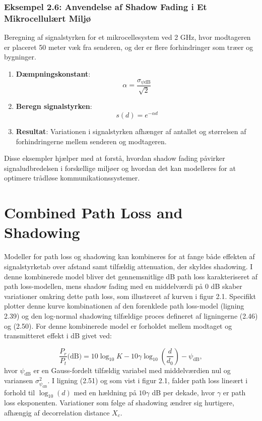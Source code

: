 \documentclass[a4paper,12pt]{book}
\begin{document}
	\subsubsection{Eksempel 2.6: Anvendelse af Shadow Fading i Et Mikrocellulært Miljø}
	
	Beregning af signalstyrken for et mikrocellesystem ved 2 GHz, hvor modtageren er placeret 50 meter væk fra senderen, og der er flere forhindringer som træer og bygninger.
	
	\begin{enumerate}
		\item \textbf{Dæmpningskonstant}:
		\[
		\alpha = \frac{\sigma_{\psi\text{dB}}}{\sqrt{2}}
		\]
		\item \textbf{Beregn signalstyrken}:
		\[
		s(d) = e^{-\alpha d}
		\]
		\item \textbf{Resultat}: Variationen i signalstyrken afhænger af antallet og størrelsen af forhindringerne mellem senderen og modtageren.
	\end{enumerate}
	
	Disse eksempler hjælper med at forstå, hvordan shadow fading påvirker signaludbredelsen i forskellige miljøer og hvordan det kan modelleres for at optimere trådløse kommunikationssystemer.
	
	\section{Combined Path Loss and Shadowing}
	Modeller for path loss og shadowing kan kombineres for at fange både effekten af signalstyrketab over afstand samt tilfældig attenuation, der skyldes shadowing. I denne kombinerede model bliver det gennemsnitlige dB path loss karakteriseret af path loss-modellen, mens shadow fading med en middelværdi på 0 dB skaber variationer omkring dette path loss, som illustreret af kurven i figur 2.1. Specifikt plotter denne kurve kombinationen af den forenklede path loss-model (ligning 2.39) og den log-normal shadowing tilfældige proces defineret af ligningerne (2.46) og (2.50). For denne kombinerede model er forholdet mellem modtaget og transmitteret effekt i dB givet ved:
	
	\[
	\frac{P_r}{P_t} \text{(dB)} = 10 \log_{10} K - 10 \gamma \log_{10}\left(\frac{d}{d_0}\right) - \psi_{\text{dB}},
	\]
	\noindent hvor \( \psi_{\text{dB}} \) er en Gauss-fordelt tilfældig variabel med middelværdien nul og variansen \( \sigma^2_{\psi_{\text{dB}}} \). I ligning (2.51) og som vist i figur 2.1, falder path loss lineært i forhold til \( \log_{10}(d) \) med en hældning på \( 10 \gamma \) dB per dekade, hvor \( \gamma \) er path loss eksponenten. Variationer som følge af shadowing ændrer sig hurtigere, afhængig af decorrelation distance \( X_c \).
	
\end{document}
